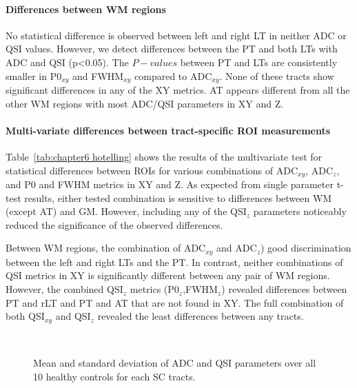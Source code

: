 \paragraph{Differences between WM regions}
No statistical difference is observed between left and right LT in neither ADC or QSI values. However, we detect differences between the PT and both LTs with ADC and QSI (p<0.05). The $P-values$ between PT and LTs are consistently smaller in P0$_{xy}$ and FWHM$_{xy}$ compared to ADC$_{xy}$. None of these tracts show significant differences in any of the XY metrics. AT appears different from all the other WM regions with  most ADC/QSI parameters in XY and Z.

\paragraph*{Multi-variate differences between tract-specific ROI measurements }
Table~\ref{tab:chapter6 hotelling} shows the results of the multivariate test for statistical differences between \glspl{ROI} for various combinations of ADC$_{xy}$, ADC$_{z}$, and P0 and FWHM metrics in XY and Z. As expected from single parameter t-test results, either tested combination is sensitive to differences between WM (except AT) and GM. However, including any of the QSI$_z$ parameters noticeably reduced the significance of the observed differences.

Between WM regions, the combination of ADC$_{xy}$ and ADC$_{z}$) good discrimination between the left and right LTs and the PT. In contrast, neither combinations of QSI metrics in XY is significantly different between any pair of WM regions. However, the combined QSI$_z$ metrics (P0$_z$,FWHM$_z$) revealed differences between PT and rLT and PT and AT that are not found in XY. The full combination of both QSI$_{xy}$ and QSI$_{z}$ revealed the least differences between any tracts.


\begin{figure}
      \centering
	  \\
	  \caption{Mean and standard deviation of ADC and QSI parameters over all 10 healthy controls for each SC tracts.}
      \label{fig:chapter6 ADC and QSI vals}
\end{figure}%

